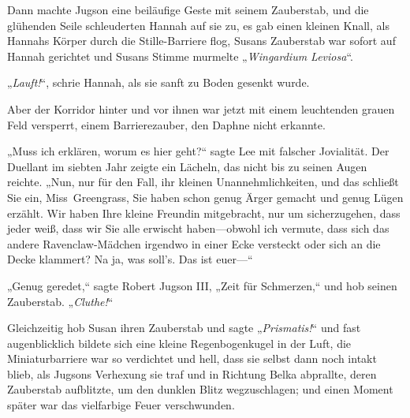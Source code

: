 Dann machte Jugson eine beiläufige Geste mit seinem Zauberstab, und die glühenden Seile schleuderten Hannah auf sie zu, es gab einen kleinen Knall, als Hannahs Körper durch die Stille-Barriere flog, Susans Zauberstab war sofort auf Hannah gerichtet und Susans Stimme murmelte „\emph{Wingardium Leviosa}“.

„\emph{Lauft!}“, schrie Hannah, als sie sanft zu Boden gesenkt wurde.

Aber der Korridor hinter und vor ihnen war jetzt mit einem leuchtenden grauen Feld versperrt, einem Barrierezauber, den Daphne nicht erkannte.

„Muss ich erklären, worum es hier geht?“ sagte Lee mit falscher Jovialität. Der Duellant im siebten Jahr zeigte ein Lächeln, das nicht bis zu seinen Augen reichte. „Nun, nur für den Fall, ihr kleinen Unannehmlichkeiten, und das schließt Sie ein, Miss~Greengrass, Sie haben schon genug Ärger gemacht und genug Lügen erzählt. Wir haben Ihre kleine Freundin mitgebracht, nur um sicherzugehen, dass jeder weiß, dass wir Sie alle erwischt haben—obwohl ich vermute, dass sich das andere Ravenclaw-Mädchen irgendwo in einer Ecke versteckt oder sich an die Decke klammert? Na ja, was soll's. Das ist euer—“

„Genug geredet,“ sagte Robert Jugson III, „Zeit für Schmerzen,“ und hob seinen Zauberstab. „\emph{Cluthe!}“

Gleichzeitig hob Susan ihren Zauberstab und sagte „\emph{Prismatis!}“ und fast augenblicklich bildete sich eine kleine Regenbogenkugel in der Luft, die Miniaturbarriere war so verdichtet und hell, dass sie selbst dann noch intakt blieb, als Jugsons Verhexung sie traf und in Richtung Belka abprallte, deren Zauberstab aufblitzte, um den dunklen Blitz wegzuschlagen; und einen Moment später war das vielfarbige Feuer verschwunden.

